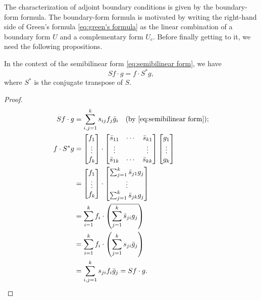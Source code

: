 \documentclass[11pt, oneside, a4paper]{article}
\begin{document}
The characterization of adjoint boundary conditions is given by the boundary-form formula. The boundary-form formula is motivated by writing the right-hand side of Green's formula \eqref{eq:green's formula} as the linear combination of a boundary form $U$ and a complementary form $U_c$. Before finally getting to it, we need the following propositions.

\begin{prop}\cite[p.287]{CoddingtonLevinson}
    In the context of the semibilinear form \eqref{eq:semibilinear form}, we have
    \begin{equation}\label{eq:semibilinear adjoint}
        Sf\cdot g = f\cdot S^*g, 
    \end{equation}
    where $S^*$ is the conjugate transpose of $S$.
\end{prop}
\begin{proof}
    \begin{align*}
        Sf\cdot g &= \sum_{i,j=1}^k s_{ij}f_j\bar{g}_i \quad\mbox{(by \eqref{eq:semibilinear form})};\\
        f\cdot S^*g &= \begin{bmatrix}
            f_1\\
            \vdots\\
            f_k
        \end{bmatrix}\cdot \begin{bmatrix}
            \bar{s}_{11} & \cdots & \bar{s}_{k1}\\
            \vdots & & \vdots\\
            \bar{s}_{1k} & \cdots & \bar{s}_{kk}
        \end{bmatrix} \begin{bmatrix}
            g_1\\
            \vdots\\
            g_k
        \end{bmatrix}\\
        &= \begin{bmatrix}
            f_1\\
            \vdots\\
            f_k
        \end{bmatrix}\cdot \begin{bmatrix}
            \sum_{j=1}^k \bar{s}_{j1}g_j\\
            \vdots\\
            \sum_{j=1}^k \bar{s}_{jk}g_j
        \end{bmatrix}\\
        &= \sum_{i=1}^k f_i\cdot \left(\overline{\sum_{j=1}^k\bar{s}_{ji}g_j}\right)\\
        &= \sum_{i=1}^k f_i\cdot \left(\sum_{j=1}^k s_{ji}\bar{g}_j\right)\\
        &= \sum_{i,j=1}^k s_{ji}f_i\bar{g}_j = Sf\cdot g.\qedhere
    \end{align*}
\end{proof}
\end{document}
